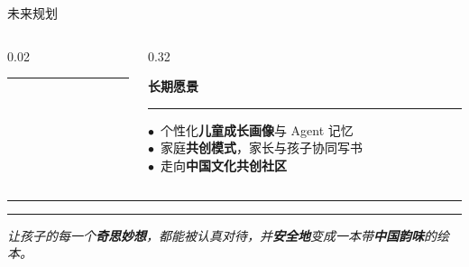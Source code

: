 \documentclass{beamer}
\newcommand{\kw}[1]{\textcolor{importantred}{\textbf{#1}}}
\newcommand{\ornamentrule}{%
  \par\vspace{4pt}%
  {\centering\textcolor{accentgold!75}{\rule[0.38em]{0.30\linewidth}{0.4pt}}\hspace{0.4em}{\color{buptred}\small$\blacklozenge$}\hspace{0.4em}\textcolor{accentgold!75}{\rule[0.38em]{0.30\linewidth}{0.4pt}}\par}%
  \vspace{3pt}%
}
\newcommand{\bignum}[1]{{\fontsize{15}{17}\selectfont\bfseries\color{buptred}#1}}
\newcommand{\heroline}[1]{%
  {\centering\color{darkred}\itshape\small #1\par}%
}
\newcommand{\redot}{\textcolor{buptred}{\scriptsize$\bullet$}~}
\begin{document}
\begin{frame}[t]{未来规划}
\begin{columns}[T, onlytextwidth]
\begin{column}[T]{0.02\linewidth}
            \centering\textcolor{accentgold!60}{\rule{0.4pt}{4.6em}}
        \end{column}
        \begin{column}[T]{0.32\linewidth}
            \centering\bignum{03}\par\vspace{2pt}
            \centering\textbf{\small 长期愿景}
            \par\vspace{4pt}
            \noindent\textcolor{accentgold!60}{\rule{\linewidth}{0.4pt}}
            \par\vspace{4pt}\raggedright\scriptsize
            \redot 个性化\kw{儿童成长画像}与 Agent 记忆\\[3pt]
            \redot 家庭\kw{共创模式}，家长与孩子协同写书\\[3pt]
            \redot 走向\textbf{中国文化共创社区}
        \end{column}
    \end{columns}

    \vspace{0.35cm}
    \ornamentrule
    \heroline{让孩子的每一个\textbf{奇思妙想}，都能被认真对待，并\textbf{安全地}变成一本带\textbf{中国韵味}的绘本。}
\end{frame}

\QApage
\end{document}

